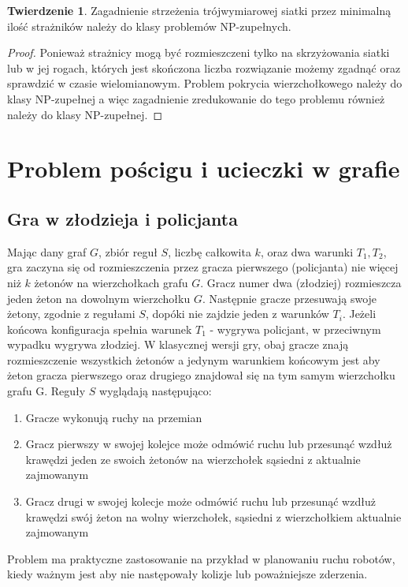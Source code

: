 \documentclass[brudnopis]{xmgr}
\theoremstyle{definition}
\newtheorem{Twierdzenie}{Twierdzenie}
\begin{document}
\begin{Twierdzenie}\cite{ntafos}
	Zagadnienie strzeżenia trójwymiarowej siatki przez minimalną ilość strażników należy do klasy problemów NP-zupełnych.
\end{Twierdzenie}
\begin{proof} 
	Ponieważ strażnicy mogą być rozmieszczeni tylko na skrzyżowania siatki lub w jej rogach, których jest skończona liczba rozwiązanie możemy zgadnąć oraz sprawdzić w czasie wielomianowym. Problem pokrycia wierzchołkowego należy do klasy NP-zupełnej a więc zagadnienie zredukowanie do tego problemu również należy do klasy NP-zupełnej.
\end{proof}

\chapter{Problem pościgu i ucieczki w grafie}
\section{Gra w złodzieja i policjanta}
Mając dany graf $G$, zbiór reguł $S$, liczbę całkowita $k$, oraz dwa warunki $T_1, T_2$, gra zaczyna się od rozmieszczenia przez gracza pierwszego (policjanta) nie więcej niż $k$ żetonów na wierzchołkach grafu $G$. Gracz numer dwa (złodziej) rozmieszcza jeden żeton na dowolnym wierzchołku $G$. Następnie gracze przesuwają swoje żetony, zgodnie z regułami $S$, dopóki nie zajdzie jeden z warunków $T_i$. Jeżeli końcowa konfiguracja spełnia warunek $T_1$ - wygrywa policjant, w przeciwnym wypadku wygrywa złodziej. W klasycznej wersji gry, obaj gracze znają rozmieszczenie wszystkich żetonów a jedynym warunkiem końcowym jest aby żeton gracza pierwszego oraz drugiego znajdował się na tym samym wierzchołku grafu G.
Reguły $S$ wyglądają następująco:
\begin{enumerate}
  \item Gracze wykonują ruchy na przemian
  \item Gracz pierwszy w swojej kolejce może odmówić ruchu lub przesunąć wzdłuż krawędzi jeden ze swoich żetonów na wierzchołek sąsiedni z aktualnie zajmowanym
  \item Gracz drugi w swojej kolecje może odmówić ruchu lub przesunąć wzdłuż krawędzi swój żeton na wolny wierzchołek, sąsiedni z wierzchołkiem aktualnie zajmowanym
\end{enumerate}

Problem ma praktyczne zastosowanie na przykład w planowaniu ruchu robotów, kiedy ważnym jest aby nie następowały kolizje lub poważniejsze zderzenia.
\end{document}
